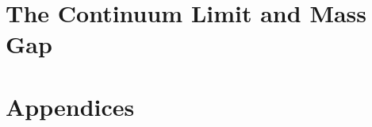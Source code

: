 \documentclass[11pt,a4paper]{article}
\begin{document}
\part{The Continuum Limit and Mass Gap}












\part{Appendices}
\appendix




\end{document}
